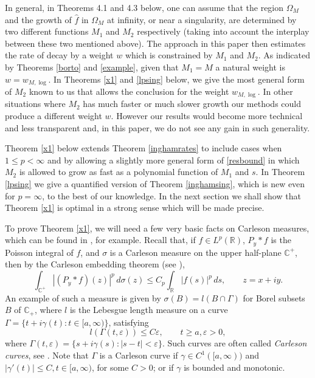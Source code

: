 \documentclass[11pt]{amsart}
\theoremstyle{definition}
\theoremstyle{remark}
\numberwithin{equation}{section}
\begin{document}
In general, in Theorems 4.1 and 4.3 below, one can assume that the region $\Omega_M$ and the growth of $\widehat f$ in $\Omega_M$ at infinity, or near a singularity, are determined by two different functions $M_1$ and $M_2$ respectively (taking into account the interplay between these two mentioned above). The approach in this paper then estimates the rate of decay by a weight $w$ which is constrained by $M_1$ and $M_2$.  As indicated by Theorems \ref{borto} and \ref{example}, given that $M_1=M$ a natural weight is $w = w_{M,\log}$.  In Theorems \ref{x1} and \ref{lpsing} below, we give the most general form of $M_2$ known to us that allows the conclusion for the weight $w_{M,\log}$.  In other situations where $M_2$ has much faster or much slower growth our methods could produce a different weight $w$. However our results would become more technical and less transparent and, in this paper, we do not see any gain in such generality.

Theorem \ref{x1} below extends Theorem \ref{inghamrates} to include cases when $1 \le p < \infty$ and by allowing a slightly more general form of \eqref{resbound} in which $M_2$ is allowed to grow as fast as a polynomial function of $M_1$ and $s$.  In Theorem \ref{lpsing} we give a quantified version of Theorem \ref{inghamsing}, which is new even for $p=\infty$, to the best of our knowledge.  In the next section we shall show that Theorem \ref{x1} is optimal in a strong sense which will be made precise.

To prove Theorem \ref{x1}, we will need a few very basic facts on Carleson measures, which can be found in \cite{Garnett}, for example.  Recall that, if $f \in L^p (\mathbb R)$,  $P_y*f$ is the  Poisson integral of $f$, and $\sigma$ is a Carleson measure on the upper half-plane $\mathbb C^+$, then by the Carleson embedding theorem (see \cite[Theorem I.5.6]{Garnett}),
\begin{equation} \label{Cembed}
\int_{\mathbb C^+} |(P_y*f) (z)|^p \, d\sigma(z) \le C_p \int_{\mathbb R} |f(s)|^p \, ds, \qquad z=x+iy.
\end{equation}
An example of such a measure is given by $\sigma (B)=l (B\cap \Gamma)$ for Borel subsets $B$ of ${{\mathbb C}}_+$, where $l$ is the Lebesgue length measure on a curve  $\Gamma=\{t + i \gamma(t): t \in [a,\infty)\}$,  satisfying
\[
l(\Gamma(t,{{\varepsilon}})) \le C {{\varepsilon}},  \qquad t\ge a, {{\varepsilon}} > 0,
\]
where $\Gamma(t,{{\varepsilon}}) = \{ s+i\gamma(s): |s-t|<{{\varepsilon}}\}$.  Such curves are often called {\it Carleson curves}, see \cite{BoKa97}. Note that $\Gamma$ is a Carleson curve if  $\gamma \in C^1([a,\infty))$ and $|\gamma'(t)|\le C, t \in [a,\infty)$, for some $C>0$; or if $\gamma$ is bounded and monotonic.
\end{document}
